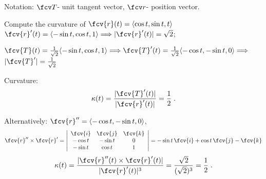 \begin{frame}
Notation: $\fcv T$- unit tangent vector, $\fcv r$- position vector.
\begin{example}
Compute the curvature of $\fcv{r}(t) = \langle \cos{t}, \sin{t}, t\rangle$
$\fcv{r}'(t) = \langle -\sin{t}, \cos{t}, 1 \rangle \Longrightarrow|\fcv{r}'(t)| = \sqrt{2}$;

$\fcv{T}(t) = \frac{1}{\sqrt{2}}
\langle -\sin{t}, \cos{t}, 1 \rangle
\Longrightarrow
\fcv{T}'(t) = \frac{1}{\sqrt{2}}
\langle -\cos{t}, -\sin{t}, 0 \rangle
\Longrightarrow $
$|\fcv{T}'|=\frac{1}{\sqrt{2}}$

Curvature:
%
$$\kappa(t) = \frac{|\fcv{T}'(t)|}{|\fcv{r}'(t)|} =
\frac{1}{2}\; .$$ 


Alternatively: $\fcv{r}''= \langle -\cos{t}, -\sin{t}, 0 \rangle$,
%
$$\fcv{r}'' \times \fcv{r}' = \left|
\begin{array}{ccc}
\fcv{i} & \fcv{j} & \fcv{k} \\
-\cos{t}&  -\sin{t}&  0 \\
-\sin{t}& \cos{t}& 1
\end{array}
\right| = -\sin{t} \, \fcv{i} +
\cos{t}\, \fcv{j} -\fcv{k} $$
%
$$\kappa(t) =
\frac{|\fcv{r}''(t) \times \fcv{r}'(t)|}
{|\fcv{r}'(t)|^3} =
\frac{\sqrt{2}}{(\sqrt{2})^3} = \frac{1}{2}\; .$$
\end{example}
\end{frame}